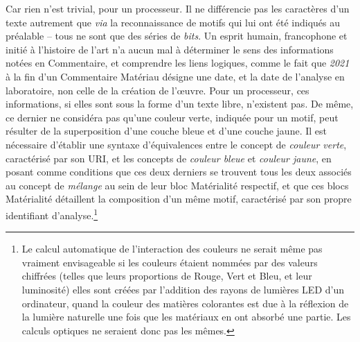 \documentclass[a4paper,12pt, twoside]{book}
\begin{document}
Car rien n’est trivial, pour un processeur. Il ne différencie pas les caractères d’un texte autrement que \textit{via} la reconnaissance de motifs qui lui ont été indiqués au préalable – tous ne sont que des séries de \textit{bits}. Un esprit humain, francophone et initié à l’histoire de l’art n’a aucun mal à déterminer le sens des informations notées en \textsf{Commentaire}, et comprendre les liens logiques, comme le fait que \textit{2021} à la fin d’un \textsf{Commentaire Matériau} désigne une date, et la date de l’analyse en laboratoire, non celle de la création de l’œuvre. Pour un processeur, ces informations, si elles sont sous la forme d’un texte libre, n’existent pas. De même, ce dernier ne considéra pas qu’une couleur verte, indiquée pour un motif, peut résulter de la superposition d’une couche bleue et d’une couche jaune. Il est nécessaire d’établir une syntaxe d’équivalences entre le concept de \textit{couleur verte}, caractérisé par son URI, et les concepts de \textit{couleur bleue} et \textit{couleur jaune}, en posant comme conditions que ces deux derniers se trouvent tous les deux associés au concept de \textit{mélange} au sein de leur bloc \textsf{Matérialité} respectif, et que ces blocs \textsf{Matérialité} détaillent la composition d’un même motif, caractérisé par son propre identifiant d’analyse.\footnote{Le calcul automatique de l’interaction des couleurs ne serait même pas vraiment envisageable si les couleurs étaient nommées par des valeurs chiffrées (telles que leurs proportions de Rouge, Vert et Bleu, et leur luminosité) elles sont créées par l’addition des rayons de lumières LED d’un ordinateur, quand la couleur des matières colorantes est due à la réflexion de la lumière naturelle une fois que les matériaux en ont absorbé une partie. Les calculs optiques ne seraient donc pas les mêmes.}
\end{document}
